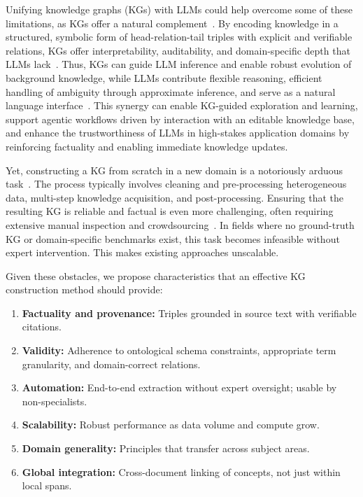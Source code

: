 \documentclass[10pt]{article}
\begin{document}
Unifying knowledge graphs (KGs) with LLMs could help overcome some of these limitations, as KGs offer a natural complement~\cite{ibrahim2024survey-kg-llm}. By encoding knowledge in a structured, symbolic form of head-relation-tail triples with explicit and verifiable relations, KGs offer interpretability, auditability, and domain-specific depth that LLMs lack~\cite{pan_et_al:TGDK}. Thus, KGs can guide LLM inference and enable robust evolution of background knowledge, while LLMs contribute flexible reasoning, efficient handling of ambiguity through approximate inference, and serve as a natural language interface~\cite{Pan2023UnifyingLL}. This synergy can enable KG-guided exploration and learning, support agentic workflows driven by interaction with an editable knowledge base, and enhance the trustworthiness of LLMs in high-stakes application domains by reinforcing factuality and enabling immediate knowledge updates. 

Yet, constructing a KG from scratch in a new domain is a notoriously arduous task~\cite{survey_atuomatic_kgc, 9416312}. The process typically involves cleaning and pre-processing heterogeneous data, multi-step knowledge acquisition, and post-processing. Ensuring that the resulting KG is reliable and factual is even more challenging, often requiring extensive manual inspection and crowdsourcing~\cite{WANG2021607}. In fields where no ground-truth KG or domain-specific benchmarks exist, this task becomes infeasible without expert intervention. This makes existing approaches unscalable.

Given these obstacles, we propose characteristics that an effective KG construction method should provide:
\begin{enumerate}
    \item \textbf{Factuality and provenance:} Triples grounded in source text with verifiable citations.
    \item \textbf{Validity:} Adherence to ontological schema constraints, appropriate term granularity, and domain-correct relations.
    \item \textbf{Automation:} End-to-end extraction without expert oversight; usable by non-specialists.  
    \item \textbf{Scalability:} Robust performance as data volume and compute grow.
    \item \textbf{Domain generality:} Principles that transfer across subject areas.  
    \item \textbf{Global integration:} Cross-document linking of concepts, not just within local spans.  
\end{enumerate}
\end{document}
